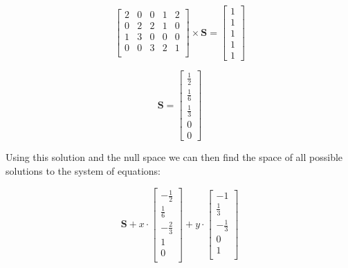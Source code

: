 \vspace{1.5em}
\begin{minipage}{0.5\textwidth}
	\begin{equation*}
		\begin{bmatrix}
			2 & 0 & 0 & 1 & 2 \\
			0 & 2 & 2 & 1 & 0 \\
			1 & 3 & 0 & 0 & 0 \\
			0 & 0 & 3 & 2 & 1 \\
		\end{bmatrix}
		\times
		\mathbf{S}
		=
		\begin{bmatrix}
			1 \\
			1 \\
			1 \\
			1 \\ 
			1
		\end{bmatrix}
	\end{equation*}
\end{minipage}
\begin{minipage}{0.5\textwidth}
	\begin{equation*}
		\mathbf{S} =
		\begin{bmatrix}
			\frac{1}{2} \\[4pt]
			\frac{1}{6} \\[4pt]
			\frac{1}{3} \\[4pt]
			0 \\
			0
		\end{bmatrix}
	\end{equation*}
\end{minipage}

\vspace{0.5em} 

Using this solution and the null space we can then find the space of all possible solutions to the system of equations:

\begin{equation*}
	\mathbf{S} + x \cdot
	\begin{bmatrix}
		-\frac{1}{2} \\
		\frac{1}{6} \\
		-\frac{2}{3} \\
		1 \\
		0 \\
	\end{bmatrix}
	+ y \cdot
	\begin{bmatrix}
		-1 \\
		\frac{1}{3} \\
		-\frac{1}{3} \\
		0 \\
		1 \\
	\end{bmatrix}
\end{equation*}

